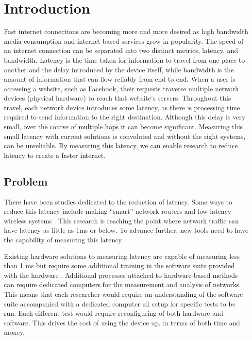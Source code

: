 \chapter{Introduction}\label{C:intro}

Fast internet connections are becoming more and more desired as high bandwidth media consumption and internet-based services grow in popularity. The speed of an internet connection can be separated into two distinct metrics,
latency, and bandwidth. Latency is the time taken for information to travel from one place to another and the delay
introduced by the device itself, while bandwidth is the amount of information that can flow reliably from end to end.
When a user is accessing a website, such as Facebook, their requests traverse multiple network devices (physical
hardware) to reach that website's servers. Throughout this travel, each network device introduces some latency, as
there is processing time required to send information to the right destination. Although this delay is very small,
over the course of multiple hops it can become significant. Measuring this small latency with current solutions is
convoluted and without the right systems, can be unreliable. By measuring this latency, we can enable research to
reduce latency to create a faster internet.

\section{Problem}

There have been studies dedicated to the reduction of latency. Some ways to reduce this latency include making “smart” network routers \cite{smartrouters} and low latency wireless systems \cite{5g}. 
This research is reaching the point where network traffic can have latency as little as 1ms \cite{lessthan1ms} or 
below. To advance further, new tools need to have the capability of measuring this latency.

Existing hardware solutions to measuring latency are capable of measuring less than 1 ms but require some additional training in the software suite provided with the hardware \cite{dagfeatures}. Additional processes attached
to hardware-based methods can require dedicated computers for the measurement and analysis of networks. This means
that each researcher would require an understanding of the software suite accompanied with a dedicated computer
all setup for specific tests to be run. Each different test would require reconfiguring of both hardware and software.
This drives the cost of using the device up, in terms of both time and money.

